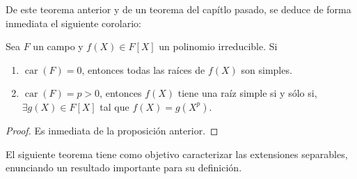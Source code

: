 \documentclass[12pt]{report}
\theoremstyle{largebreak}
\DeclareMathOperator{\car}{car}
\begin{document}
    De este teorema anterior y de un teorema del capítlo pasado, se deduce de forma inmediata el siguiente corolario:

    \begin{cor}
        Sea $F$ un campo y $f(X)\in F[X]$ un polinomio irreducible. Si
        \begin{enumerate}
            \item $\car(F)=0$, entonces todas las raíces de $f(X)$ son simples.
            \item $\car(F)=p>0$, entonces $f(X)$ tiene una raíz simple si y sólo si, $\exists g(X)\in F[X]$ tal que $f(X)=g(X^{p})$.
        \end{enumerate}
    \end{cor}

    \begin{proof}
        Es inmediata de la proposición anterior.
    \end{proof}

    El siguiente teorema tiene como objetivo caracterizar las extensiones separables, enunciando un resultado importante para su definición.
\end{document}
